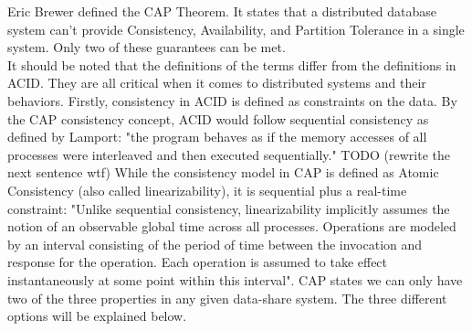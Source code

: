 \documentclass[a4paper,10pt,titlepage]{report}
\begin{document}
Eric Brewer defined the CAP Theorem\cite{CAP}. It states that a distributed database system can't provide Consistency, Availability, and Partition Tolerance in a single system. Only two of these guarantees can be met.\\
\vspace{5mm}
It should be noted that the definitions of the terms differ from the definitions in ACID. They are all critical when it comes to distributed systems and their behaviors. Firstly, consistency in ACID is defined as constraints on the data. By the CAP consistency concept, ACID would follow sequential consistency as defined by Lamport\cite{lamport1993how}: "the program behaves as if the memory accesses of all processes were interleaved and then executed sequentially." TODO (rewrite the next sentence  wtf) While the consistency model in CAP is defined as Atomic Consistency (also called linearizability), it is sequential plus a real-time constraint: "Unlike sequential consistency, linearizability implicitly assumes the notion of an observable global time across all processes. Operations are modeled by an interval consisting of the period of time between the invocation and response for the operation. Each operation is assumed to take effect instantaneously at some point within this interval". \cite{CSL-TR-95-685}
\vspace{5mm}
CAP states we can only have two of the three properties in any given data-share system. The three different options will be explained below.
\end{document}

